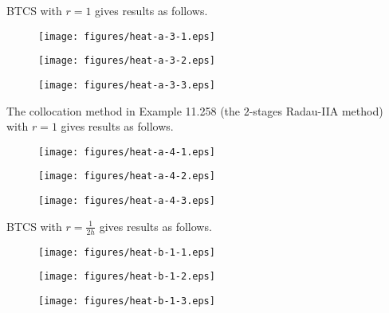 \documentclass[twocolumn,10pt]{article}
\begin{document}
BTCS with $r=1$ gives results as follows.

\vspace{-.3em}\begin{figure}[H]
    \centering
    \begin{minipage}[t]{0.32\linewidth}
        \centering
        \texttt{[image: figures/heat-a-3-1.eps]}
    \end{minipage}
    \begin{minipage}[t]{0.32\linewidth}
        \centering
        \texttt{[image: figures/heat-a-3-2.eps]}
    \end{minipage}
    \begin{minipage}[t]{0.32\linewidth}
        \centering
        \texttt{[image: figures/heat-a-3-3.eps]}
    \end{minipage}
\end{figure} \vspace{-.5em}

The collocation method in Example 11.258 (the $2$-stages Radau-IIA method) with $r=1$ gives results as follows.

\vspace{-.3em}\begin{figure}[H]
    \centering
    \begin{minipage}[t]{0.32\linewidth}
        \centering
        \texttt{[image: figures/heat-a-4-1.eps]}
    \end{minipage}
    \begin{minipage}[t]{0.32\linewidth}
        \centering
        \texttt{[image: figures/heat-a-4-2.eps]}
    \end{minipage}
    \begin{minipage}[t]{0.32\linewidth}
        \centering
        \texttt{[image: figures/heat-a-4-3.eps]}
    \end{minipage}
\end{figure} \vspace{-.5em}

BTCS with $r=\frac{1}{2h}$ gives results as follows.

\vspace{-.3em}\begin{figure}[H]
    \centering
    \begin{minipage}[t]{0.32\linewidth}
        \centering
        \texttt{[image: figures/heat-b-1-1.eps]}
    \end{minipage}
    \begin{minipage}[t]{0.32\linewidth}
        \centering
        \texttt{[image: figures/heat-b-1-2.eps]}
    \end{minipage}
    \begin{minipage}[t]{0.32\linewidth}
        \centering
        \texttt{[image: figures/heat-b-1-3.eps]}
    \end{minipage}
\end{figure} \vspace{-.5em}
\end{document}
